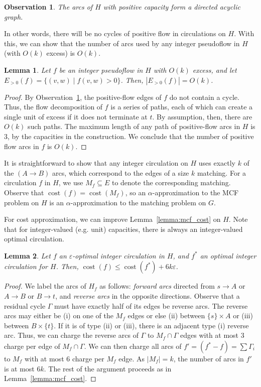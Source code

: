\documentclass[11pt]{article}
\def\eps{\varepsilon}
\theoremstyle{plain}
\newtheorem{lemma}{Lemma}
\newtheorem{observation}{Observation}
\def\cost{\operatorname{cost}}
\begin{document}
\begin{observation}
\label{observation:dag}
	The arcs of $H$ with positive capacity form a directed acyclic graph.
\end{observation}

In other words, there will be no cycles of positive flow in circulations on
$H$.
With this, we can show that the number of arcs used by any integer pseudoflow
in $H$ (with $O(k)$ excess) is $O(k)$.

\begin{lemma}
\label{lemma:reduction_count}
	Let $f$ be an integer pseudoflow in $H$ with $O(k)$ excess, and let
	$E_{>0}(f) = \{(v, w) \mid f(v, w) > 0\}$.
	Then, $|E_{>0}(f)| = O(k)$.
\end{lemma}
\begin{proof}
	By Observation~\ref{observation:dag}, the positive-flow edges of $f$
	do not contain a cycle.
	Thus, the flow decomposition of $f$ is a series of paths, each of which
	can create a single unit of excess if it does not terminate at $t$.
	By assumption, then, there are $O(k)$ such paths.
	The maximum length of any path of positive-flow arcs in $H$ is 3,
	by the capacities in the construction.
	We conclude that the number of positive flow arcs in $f$ is $O(k)$.
\end{proof}

It is straightforward to show that any integer circulation on $H$ uses exactly
$k$ of the $(A \to B)$ arcs, which correspond to the edges of a size $k$
matching.
For a circulation $f$ in $H$, we use $M_f \subseteq E$ to denote the
corresponding matching.
Observe that $\cost(f) = \cost(M_f)$, so an $\alpha$-approximation to the MCF
problem on $H$ is an $\alpha$-approximation to the matching problem on $G$.

For cost approximation, we can improve Lemma~\ref{lemma:mcf_cost} on $H$.
Note that for integer-valued (e.g. unit) capacities, there is always an
integer-valued optimal circulation.
\begin{lemma}
\label{lemma:goldberg_cost_add}
	Let $f$ an $\eps$-optimal integer circulation in $H$, and $f^*$ an
	optimal integer circulation for $H$.
	Then, $\cost(f) \leq \cost(f^*) + 6k\eps$.
\end{lemma}
\begin{proof}
	We label the arcs of $H_f$ as follows: \emph{forward arcs} directed
	from $s \to A$ or $A \to B$ or $B \to t$, and \emph{reverse arcs} in
	the opposite directions.
	Observe that a residual cycle $\Gamma$ must have exactly half of its
	edges be reverse arcs.
	The reverse arcs may either be (i) on one of the $M_f$ edges or else
	(ii) between $\{s\} \times A$ or (iii) between $B \times \{t\}$.
	If it is of type (ii) or (iii), there is an adjacent type (i) reverse
	arc.
	Thus, we can charge the reverse arcs of $\Gamma$ to $M_f \cap \Gamma$
	edges with at most 3 charge per edge of $M_f \cap \Gamma$.
	We can then charge all arcs of $f' = (f^* - f) = \sum \Gamma_i$ to
	$M_f$ with at most 6 charge per $M_f$ edge.
	As $|M_f| = k$, the number of arcs in $f'$ is at most $6k$.
	The rest of the argument proceeds as in Lemma~\ref{lemma:mcf_cost}.
\end{proof}
\end{document}
